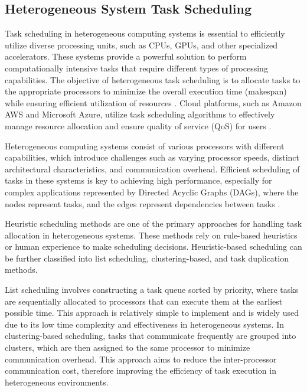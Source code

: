 \subsection{Heterogeneous System Task Scheduling}

Task scheduling in heterogeneous computing systems is essential to efficiently utilize diverse processing units, such as CPUs, GPUs, and other specialized accelerators. These systems provide a powerful solution to perform computationally intensive tasks that require different types of processing capabilities. The objective of heterogeneous task scheduling is to allocate tasks to the appropriate processors to minimize the overall execution time (makespan) while ensuring efficient utilization of resources \cite{Fan2016}.  Cloud platforms, such as Amazon AWS and Microsoft Azure, utilize task scheduling algorithms to effectively manage resource allocation and ensure quality of service (QoS) for users \cite{Yiheng2024}.

Heterogeneous computing systems consist of various processors with different capabilities, which introduce challenges such as varying processor speeds, distinct architectural characteristics, and communication overhead. Efficient scheduling of tasks in these systems is key to achieving high performance, especially for complex applications represented by Directed Acyclic Graphs (DAGs), where the nodes represent tasks, and the edges represent dependencies between tasks \cite{Amalarethinam2015}. 

Heuristic scheduling methods are one of the primary approaches for handling task allocation in heterogeneous systems. These methods rely on rule-based heuristics or human experience to make scheduling decisions. Heuristic-based scheduling can be further classified into list scheduling, clustering-based, and task duplication methods\cite{AlEbrahim2017,Fan2016}.

List scheduling involves constructing a task queue sorted by priority, where tasks are sequentially allocated to processors that can execute them at the earliest possible time. This approach is relatively simple to implement and is widely used due to its low time complexity and effectiveness in heterogeneous systems. In clustering-based scheduling, tasks that communicate frequently are grouped into clusters, which are then assigned to the same processor to minimize communication overhead. This approach aims to reduce the inter-processor communication cost, therefore improving the efficiency of task execution in heterogeneous environments. 

